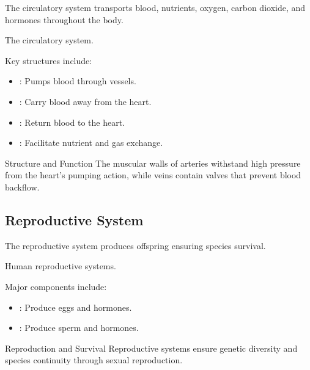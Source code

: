 The circulatory system transports blood, nutrients, oxygen, carbon dioxide, and hormones throughout the body.

\begin{marginfigure}
\caption{The circulatory system.}
\end{marginfigure}

Key structures include:

\begin{itemize}
    \item {}: Pumps blood through vessels.
    \item {}: Carry blood away from the heart.
    \item {}: Return blood to the heart.
    \item {}: Facilitate nutrient and gas exchange.
\end{itemize}

\begin{keyconcept}{Structure and Function}
The muscular walls of arteries withstand high pressure from the heart's pumping action, while veins contain valves that prevent blood backflow.
\end{keyconcept}

\subsection{Reproductive System}

The reproductive system produces offspring ensuring species survival.

\begin{marginfigure}
\caption{Human reproductive systems.}
\end{marginfigure}

Major components include:

\begin{itemize}
    \item {}: Produce eggs and hormones.
    \item {}: Produce sperm and hormones.
\end{itemize}

\begin{keyconcept}{Reproduction and Survival}
Reproductive systems ensure genetic diversity and species continuity through sexual reproduction.
\end{keyconcept}

